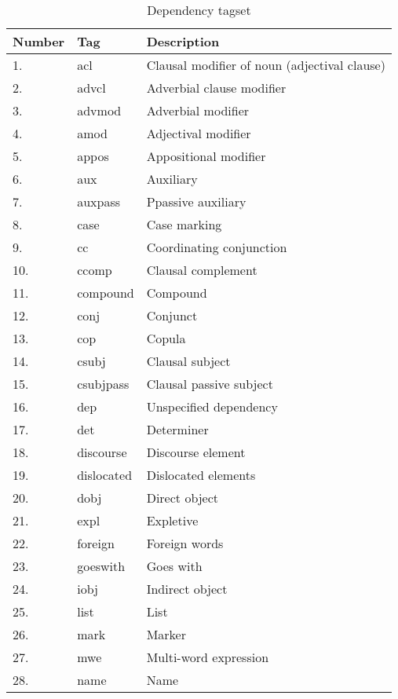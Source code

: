 \begin{table}[h]
	\centering
	      \caption{Dependency tagset}
     \label{table:AllDependencyTags}
    \begin{tabular}{| l | l | l |}
    \hline
    Number & Tag & Description \\ \hline
	\hline
1. & 	acl  & Clausal modifier of noun (adjectival clause) \\ \hline
2. &    advcl  & Adverbial clause modifier\\ \hline
3. & 	advmod  & Adverbial modifier \\ \hline
4. &    amod  & Adjectival modifier \\ \hline
5. & 	appos  & Appositional modifier \\ \hline
6. & 	aux  & Auxiliary \\ \hline
7. &    auxpass  & Ppassive auxiliary \\ \hline
8. & 	case  & Case marking \\ \hline
9. & 	cc  & Coordinating conjunction \\ \hline
10. &  ccomp  & Clausal complement \\ \hline
11. &  compound  & Compound \\ \hline
12. & 	conj  & Conjunct \\ \hline
13. & 	cop  & Copula \\ \hline
14. &  csubj  & Clausal subject \\ \hline
15. &  csubjpass  & Clausal passive subject \\ \hline
16. &  dep  & Unspecified dependency \\ \hline
17. & det  & Determiner \\ \hline
18. & discourse  & Discourse element \\ \hline
19. &  dislocated  & Dislocated elements \\ \hline
20. & 	dobj  & Direct object \\ \hline
21. &  expl  & Expletive \\ \hline
22. &  foreign  & Foreign words \\ \hline
23. &  goeswith  & Goes with \\ \hline
24. &  iobj  & Indirect object \\ \hline
25. &  list  & List \\ \hline
26. &  mark  & Marker \\ \hline
27. &  mwe  & Multi-word expression \\ \hline
28. &  name  & Name \\ \hline

\end{tabular}
\end{table}
